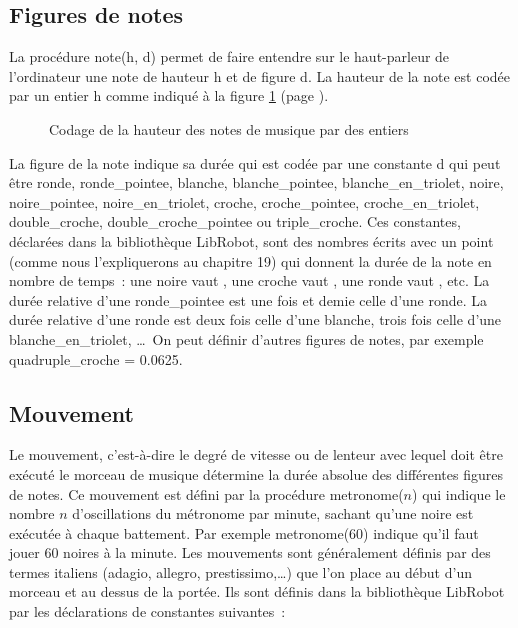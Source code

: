 \subsection{Figures de notes}

La procédure {\idt note(h, d)} permet
de faire entendre sur le haut-parleur de l'ordinateur une note de hauteur {\idt h} et de
figure {\idt d}. La hauteur de la note est codée par un entier {\idt h} comme indiqué à la figure
\ref{fig:codenotes} (page \pageref{fig:codenotes}).
\begin{figure}[htbp]
 
 \caption{Codage de la hauteur des notes de musique par des entiers}\label{fig:codenotes}
\end{figure}
La figure de la note indique sa durée qui est codée par une constante {\idt d} qui peut être {\idt ronde},
{\idt ronde\_pointee},
{\idt blanche},
{\idt blanche\_pointee},
{\idt blanche\_en\_triolet},
{\idt noire},
{\idt noi\-re\_poin\-tee},
{\idt noi\-re\_\-en\_\-tri\-o\-let},
 {\idt croche},
 {\idt croche\_pointee},
{\idt cro\-che\_\-en\_\-trio\-let},
{\idt double\_croche},
{\idt dou\-ble\_\-cro\-che\_\-poin\-tee} ou
{\idt tri\-ple\_\-cro\-che}. Ces constantes, déclarées dans la bibliothèque {\idt LibRobot},
sont des nombres écrits avec un point (comme nous l'expliquerons au chapitre 19) qui
donnent la durée de la note en nombre de temps~: une {\idt noire} vaut {},
une {\idt croche} vaut {}, une {\idt ronde} vaut {}, etc.
La durée relative d'une {\idt ron\-de\_\-poin\-tee} est
une fois et demie celle d'une
 {\idt ronde}. La durée relative d'une {\idt ronde} est  deux fois celle d'une
 {\idt blanche}, trois fois celle d'une {\idt blan\-che\_\-en\_\-trio\-let}, \ldots\
On peut définir d'autres figures de notes, par exemple
{\idt quadruple\_croche = 0.0625}.

 \subsection{Mouvement}

 Le mouvement,
 c'est-à-dire le degré de vitesse ou de lenteur avec lequel doit être exécuté le morceau de
 musique détermine la durée absolue des différentes figures de notes. Ce mouvement est défini
 par la procédure {\idt metronome($n$)} qui indique le nombre $n$ d'oscillations du
 métronome par minute, sachant qu'une noire est exécutée à chaque battement.  Par exemple
 {\idt metronome(60)} indique qu'il faut jouer 60 noires à la minute. Les mouvements
 sont gé\-né\-ra\-le\-ment définis par des termes italiens (adagio, allegro, prestissimo,\ldots) que
 l'on place au début d'un morceau et au dessus de la portée. Ils sont définis
 dans la bibliothèque {\idt LibRobot} par les déclarations de constantes suivantes~:

